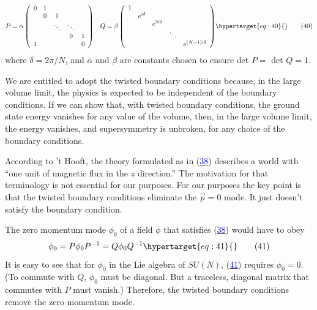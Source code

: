 \documentclass[11pt,a4paper]{article}
\newcommand{\eqtarget}[1]{\hypertarget{eq:#1}{\mathstrut}\tag{#1}}
\newcommand{\eqnref}[1]{(\hyperlink{eq:#1}{\textcolor{blue}{#1}})}
\begin{document}
\begin{equation}
\begin{aligned}
& P = \alpha
\left(
\begin{array}{ccccc}
0 & 1 & & & \\
& 0 & 1 & & \\
& & \ddots & \ddots & \\
& & & 0 & 1 \\
1 & & & & 0
\end{array}
\right)
& Q = \beta
\left(
\begin{array}{ccccc}
1 & & & & \\
& e^{i\delta} & & & \\
& & e^{2i\delta} & & \\
& & & \ddots & \\
& & & & e^{(N-1)i\delta}
\end{array}
\right)
\end{aligned}
\eqtarget{40}
\end{equation}
where $\delta = 2\pi/N$, and $\alpha$ and $\beta$ are constants chosen to ensure det $P =$
det $Q = 1$.

We are entitled to adopt the twisted boundary conditions because,
in the large volume limit, the physics is expected to be
independent of the boundary conditions. If we can show that, with
twisted boundary conditions, the ground state energy vanishes for
any value of the volume, then, in the large volume limit, the energy
vanishes, and supersymmetry is unbroken, for any choice of the
boundary conditions.

According to 't Hooft, the theory formulated as in \eqnref{38} describes
a world with ``one unit of magnetic flux in the $z$ direction.''
The motivation for that terminology is not essential for our purposes.
For our purposes the key point is that the twisted boundary
conditions eliminate the $\vec p = 0$ mode. It just doesn't satisfy the
boundary condition.

The zero momentum mode $\phi_0$ of a field $\phi$ that satisfies \eqnref{38}
would have to obey
\begin{equation}
\phi_0 = P \phi_0 P^{-1} = Q \phi_0 Q^{-1}
\eqtarget{41}
\end{equation}
It is easy to see that for $\phi_0$ in the Lie algebra of $SU(N)$, \eqnref{41}
requires $\phi_0 = 0$. (To commute with $Q$, $\phi_0$ must be diagonal. But a
traceless, diagonal matrix that commutes with $P$ must vanish.) Therefore,
the twisted boundary conditions remove the zero momentum mode.
\end{document}
